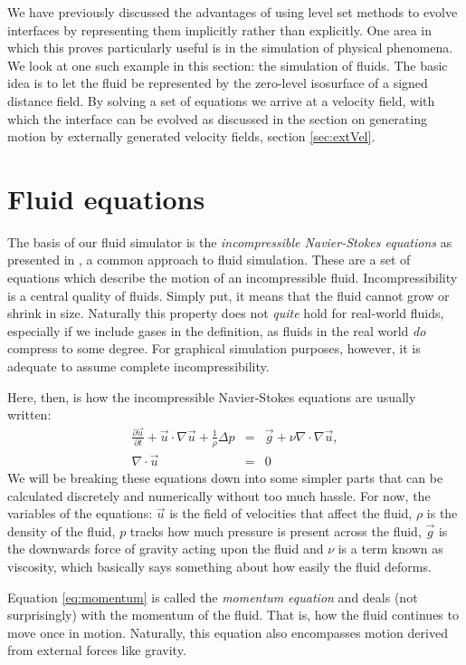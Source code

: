 We have previously discussed the advantages of using level set methods to evolve interfaces by representing them implicitly rather than explicitly. One area in which this proves particularly useful is in the simulation of physical phenomena. We look at one such example in this section: the simulation of fluids.
The basic idea is to let the fluid be represented by the zero-level isosurface of a signed distance field. By solving a set of equations we arrive at a velocity field, with which the interface can be evolved as discussed in the section on generating motion by externally generated velocity fields, section \vref{sec:extVel}.

\section{Fluid equations}
The basis of our fluid simulator is the \emph{incompressible Navier-Stokes equations} as presented in , a common approach to fluid simulation. These are a set of equations which describe the motion of an incompressible fluid. Incompressibility is a central quality of fluids. Simply put, it means that the fluid cannot grow or shrink in size. Naturally this property does not \textit{quite} hold for real-world fluids, especially if we include gases in the definition, as fluids in the real world \textit{do} compress to some degree. For graphical simulation purposes, however, it is adequate to assume complete incompressibility.

Here, then, is how the incompressible Navier-Stokes equations are usually written:
\begin{eqnarray}
\label{eq:momentum}
\frac{\partial\vec{u}}{\partial t}+\vec{u} \cdot \nabla\vec{u} + \frac{1}{\rho}\Delta p &=& \vec{g}+\nu\nabla\cdot\nabla\vec{u},\\
\label{eq:incomp}
\nabla\cdot\vec{u}&=&0
\end{eqnarray}
We will be breaking these equations down into some simpler parts that can be calculated discretely and numerically without too much hassle. For now, the variables of the equations: $\vec u$ is the field of velocities that affect the fluid, $\rho$ is the density of the fluid, $p$ tracks how much pressure is present across the fluid, $\vec{g}$ is the downwards force of gravity acting upon the fluid and $\nu$ is a term known as viscosity, which basically says something about how easily the fluid deforms.

Equation \vref{eq:momentum} is called the \emph{momentum equation} and deals (not surprisingly) with the momentum of the fluid. That is, how the fluid continues to move once in motion. Naturally, this equation also encompasses motion derived from external forces like gravity.

